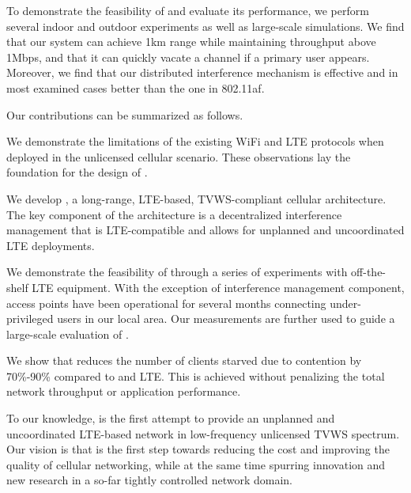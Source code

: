 

To demonstrate the feasibility of \cf and evaluate its performance, 
we perform several indoor and outdoor experiments as well as large-scale simulations. 
We find that our system can achieve 1km range while maintaining throughput above 1Mbps, and that it can quickly vacate a channel if a primary user appears. 
Moreover, we find that our distributed interference mechanism is effective and in most examined cases better than the one in 802.11af. 

Our contributions can be summarized as follows. 



\begin{sitemize}
\item We demonstrate the limitations
    of the existing WiFi and LTE protocols when deployed in the unlicensed
  cellular scenario. These observations lay the foundation for the  design of \cf.  
\item We develop \cf, a long-range, LTE-based, TVWS-compliant cellular architecture. The key component of the architecture is a decentralized interference management that is LTE-compatible and allows for unplanned and uncoordinated LTE deployments. 
\item We demonstrate the feasibility of \cf through a series of experiments with off-the-shelf LTE equipment. 
With the exception of interference management component, \cf access points have been operational for several 
months connecting under-privileged users in our local area. Our measurements are further used to guide a large-scale evaluation of \cf. 
\item We show that \cf reduces the number of clients starved due to contention  by 70\%-90\% compared to \wf and LTE. This is achieved without penalizing the total network throughput or application performance.
\end{sitemize}

To our knowledge, \cf is the first attempt to provide an unplanned and uncoordinated LTE-based network in low-frequency unlicensed TVWS spectrum.
Our vision is that \cf is the first step towards reducing the cost and improving the quality of cellular networking, 
while at the same time spurring innovation and new research in a so-far tightly controlled network domain. 



